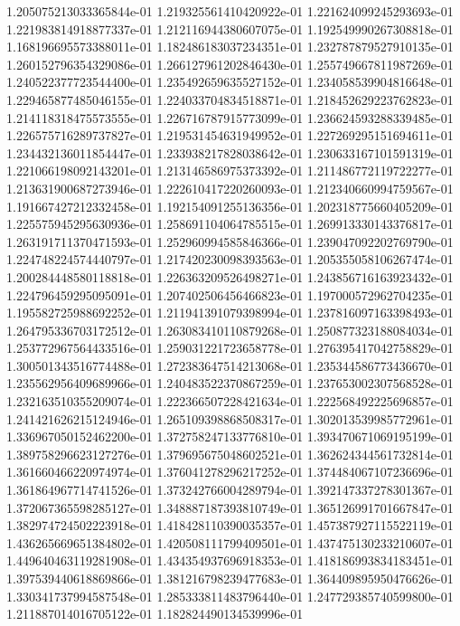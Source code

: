 1.205075213033365844e-01
1.219325561410420922e-01
1.221624099245293693e-01
1.221983814918877337e-01
1.212116944380607075e-01
1.192549990267308818e-01
1.168196695573388011e-01
1.182486183037234351e-01
1.232787879527910135e-01
1.260152796354329086e-01
1.266127961202846430e-01
1.255749667811987269e-01
1.240522377723544400e-01
1.235492659635527152e-01
1.234058539904816648e-01
1.229465877485046155e-01
1.224033704834518871e-01
1.218452629223762823e-01
1.214118318475573555e-01
1.226716787915773099e-01
1.236624593288339485e-01
1.226575716289737827e-01
1.219531454631949952e-01
1.227269295151694611e-01
1.234432136011854447e-01
1.233938217828038642e-01
1.230633167101591319e-01
1.221066198092143201e-01
1.213146586975373392e-01
1.211486772119722277e-01
1.213631900687273946e-01
1.222610417220260093e-01
1.212340660994759567e-01
1.191667427212332458e-01
1.192154091255136356e-01
1.202318775660405209e-01
1.225575945295630936e-01
1.258691104064785515e-01
1.269913330143376817e-01
1.263191711370471593e-01
1.252960994585846366e-01
1.239047092202769790e-01
1.224748224574440797e-01
1.217420230098393563e-01
1.205355058106267474e-01
1.200284448580118818e-01
1.226363209526498271e-01
1.243856716163923432e-01
1.224796459295095091e-01
1.207402506456466823e-01
1.197000572962704235e-01
1.195582725988692252e-01
1.211941391079398994e-01
1.237816097163398493e-01
1.264795336703172512e-01
1.263083410110879268e-01
1.250877323188084034e-01
1.253772967564433516e-01
1.259031221723658778e-01
1.276395417042758829e-01
1.300501343516774488e-01
1.272383647514213068e-01
1.235344586773436670e-01
1.235562956409689966e-01
1.240483522370867259e-01
1.237653002307568528e-01
1.232163510355209074e-01
1.222366507228421634e-01
1.222568492225696857e-01
1.241421626215124946e-01
1.265109398868508317e-01
1.302013539985772961e-01
1.336967050152462200e-01
1.372758247133776810e-01
1.393470671069195199e-01
1.389758296623127276e-01
1.379695675048602521e-01
1.362624344561732814e-01
1.361660466220974974e-01
1.376041278296217252e-01
1.374484067107236696e-01
1.361864967714741526e-01
1.373242766004289794e-01
1.392147337278301367e-01
1.372067365598285127e-01
1.348887187393810749e-01
1.365126991701667847e-01
1.382974724502223918e-01
1.418428110390035357e-01
1.457387927115522119e-01
1.436265669651384802e-01
1.420508111799409501e-01
1.437475130233210607e-01
1.449640463119281908e-01
1.434354937696918353e-01
1.418186993834183451e-01
1.397539440618869866e-01
1.381216798239477683e-01
1.364409895950476626e-01
1.330341737994587548e-01
1.285333811483796440e-01
1.247729385740599800e-01
1.211887014016705122e-01
1.182824490134539996e-01
